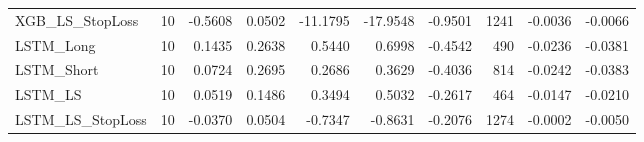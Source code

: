 \begin{tabular}{llrrrrrrrr}
\cline{1-10}
XGB\_LS\_StopLoss & 10 & -0.5608 & 0.0502 & -11.1795 & -17.9548 & -0.9501 & 1241 & -0.0036 & -0.0066 \\
\cline{1-10}
LSTM\_Long & 10 & 0.1435 & 0.2638 & 0.5440 & 0.6998 & -0.4542 & 490 & -0.0236 & -0.0381 \\
\cline{1-10}
LSTM\_Short & 10 & 0.0724 & 0.2695 & 0.2686 & 0.3629 & -0.4036 & 814 & -0.0242 & -0.0383 \\
\cline{1-10}
LSTM\_LS & 10 & 0.0519 & 0.1486 & 0.3494 & 0.5032 & -0.2617 & 464 & -0.0147 & -0.0210 \\
\cline{1-10}
LSTM\_LS\_StopLoss & 10 & -0.0370 & 0.0504 & -0.7347 & -0.8631 & -0.2076 & 1274 & -0.0002 & -0.0050 \\
\cline{1-10}
\bottomrule
\end{tabular}
